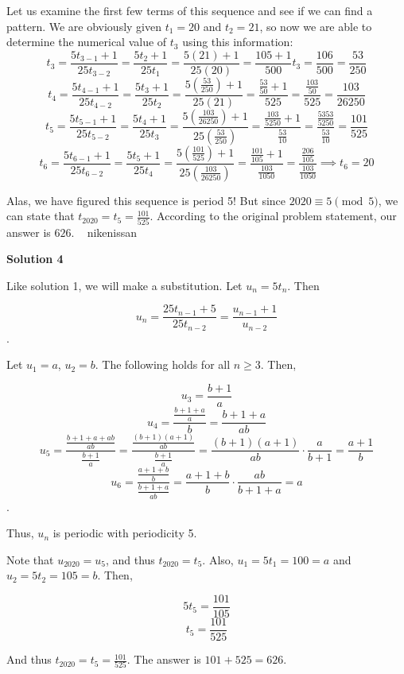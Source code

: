 \begin{enumerate}
Let us examine the first few terms of this sequence and see if we can find a pattern. We are obviously given $t_1 = 20$ and $t_2 = 21$, so now we are able to determine the numerical value of $t_3$ using this information:
 \[t_3 = \frac{5t_{3-1}+1}{25t_{3-2}} = \frac{5t_{2}+1}{25t_{1}} = \frac{5(21) + 1}{25(20)} = \frac{105 + 1}{500}t_3 = \frac{106}{500}  = \frac{53}{250}\]
 \[t_4 = \frac{5t_{4-1}+1}{25t_{4-2}} = \frac{5t_{3}+1}{25t_{2}} = \frac{5(\frac{53}{250}) + 1}{25(21)} = \frac{\frac{53}{50} + 1}{525} = \frac{\frac{103}{50}}{525} = \frac{103}{26250}\]
 \[t_5 = \frac{5t_{5-1}+1}{25t_{5-2}} = \frac{5t_{4}+1}{25t_{3}} = \frac{5(\frac{103}{26250}) + 1}{25(\frac{53}{250})} = \frac{\frac{103}{5250} + 1}{\frac{53}{10}} = \frac{\frac{5353}{5250}}{\frac{53}{10}} = \frac{101}{525}\]
 \[t_6 = \frac{5t_{6-1}+1}{25t_{6-2}} = \frac{5t_{5}+1}{25t_{4}} = \frac{5(\frac{101}{525}) + 1}{25(\frac{103}{26250})} = \frac{\frac{101}{105} + 1}{\frac{103}{1050}} = \frac{\frac{206}{105}}{\frac{103}{1050}} \implies t_6 = 20\]

 Alas, we have figured this sequence is period 5! But since $2020 \equiv 5 \pmod 5$, we can state that $t_{2020} = t_5 = \frac{101}{525}$. According to the original problem statement, our answer is $\boxed{626}$. ~ nikenissan

 



\textbf{Solution 4}

Like solution 1, we will make a substitution. Let $u_n = 5t_n$. Then

 
 \[u_n = \frac{25t_{n-1} + 5}{25t_{n-2}} = \frac{u_{n-1} + 1}{u_{n-2}}\].

 Let $u_1 = a$, $u_2 = b$. The following holds for all $n \ge 3$. Then,

 
 \[u_3 = \frac{b+1}{a}\]
 \[u_4 = \frac{\frac{b+1+a}{a}}{b} = \frac{b+1+a}{ab}\]
 \[u_5 = \frac{\frac{b+1+a+ab}{ab}}{\frac{b+1}{a}} = \frac{\frac{(b+1)(a+1)}{ab}}{\frac{b+1}{a}} = \frac{(b+1)(a+1)}{ab} \cdot \frac{a}{b+1} = \frac{a+1}{b}\]
 \[u_6 = \frac{\frac{a+1+b}{b}}{\frac{b+1+a}{ab}} = \frac{a+1+b}{b} \cdot \frac{ab}{b+1+a} = a\].

 Thus, $u_n$ is periodic with periodicity 5.

 Note that $u_{2020} = u_5$, and thus $t_{2020} = t_5$. Also, $u_1 = 5t_1 = 100 = a$ and $u_2 = 5t_2 = 105 = b$. Then,

 
 \[5t_5 = \frac{101}{105}\]
 \[t_5 = \frac{101}{525}\]

 And thus $t_{2020} = t_5 = \frac{101}{525}$. The answer is $101 + 525 = \boxed{626}$.


\end{enumerate}
